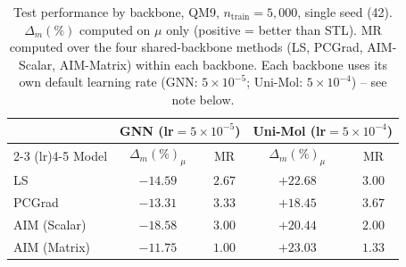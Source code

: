 %

\begin{table}[t]
\centering
\caption{Test performance by backbone, QM9, $n_{\text{train}}=5{,}000$, single
seed (42). $\Delta_m(\%)$ computed on $\mu$ only (positive = better than STL).
MR computed over the four shared-backbone methods (LS, PCGrad, AIM-Scalar,
AIM-Matrix) within each backbone. Each backbone uses its own default learning
rate (GNN: $5\times10^{-5}$; Uni-Mol: $5\times10^{-4}$) -- see note below.}
\label{tab:gnn_vs_unimol_5k}
\begin{tabular}{lcccc}
\toprule
 & \multicolumn{2}{c}{GNN (lr$=5\times10^{-5}$)} & \multicolumn{2}{c}{Uni-Mol (lr$=5\times10^{-4}$)} \\
\cmidrule(lr){2-3} \cmidrule(lr){4-5}
Model & $\Delta_m(\%)_{\mu}$ & MR & $\Delta_m(\%)_{\mu}$ & MR \\
\midrule
LS           & $-14.59$          & $2.67$          & $+22.68$          & $3.00$ \\
PCGrad       & $-13.31$          & $3.33$          & $+18.45$          & $3.67$ \\
AIM (Scalar) & $-18.58$          & $3.00$          & $+20.44$          & $2.00$ \\
AIM (Matrix) & $\mathbf{-11.75}$ & $\mathbf{1.00}$ & $\mathbf{+23.03}$ & $\mathbf{1.33}$ \\
\bottomrule
\end{tabular}
\end{table}

